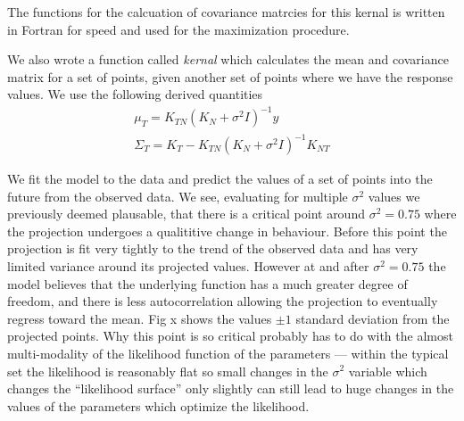\documentclass[a4paper]{article}
\begin{document}
The functions for the calcuation of covariance matrcies for this kernal is written in Fortran for speed and used for the maximization procedure.

We also wrote a function called \emph{kernal} which calculates the mean and covariance matrix for a set of points, given another set of points where we have the response values. We use the following derived quantities
\begin{gather}
\mu_T = K_{TN} {(K_N + \sigma^2I)}^{-1} y \\
\Sigma_T = K_T - K_{TN} {(K_N + \sigma^2I)}^{-1} K_{NT}
\end{gather}

We fit the model to the data and predict the values of a set of points into the future from the observed data. We see, evaluating for multiple $\sigma^2$ values we previously deemed plausable, that there is a critical point around $\sigma^2 = 0.75$ where the projection undergoes a qualititive change in behaviour. Before this point the projection is fit very tightly to the trend of the observed data and has very limited variance around its projected values. However at and after $\sigma^2 = 0.75$ the model believes that the underlying function has a much greater degree of freedom, and there is less autocorrelation allowing the projection to eventually regress toward the mean. Fig x shows the values $\pm 1$ standard deviation from the projected points. Why this point is so critical probably has to do with the almost multi-modality of the likelihood function of the parameters --- within the typical set the likelihood is reasonably flat so small changes in the $\sigma^2$ variable which changes the ``likelihood surface'' only slightly can still lead to huge changes in the values of the parameters which optimize the likelihood. 
\end{document}
